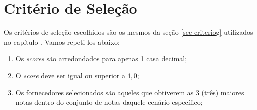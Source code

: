 \section{Critério de Seleção}
\label{sec-criteriof}

Os critérios de seleção escolhidos são os mesmos da seção \ref{sec-criteriog} utilizados no capítulo . Vamos repeti-los abaixo:

\begin{enumerate}
    \item Os \emph{scores} são arredondados para apenas 1 casa decimal;  
    \item O \emph{score} deve ser igual ou superior a $4,0$;
    \item Os fornecedores selecionados são aqueles que obtiverem as 3 (três) maiores notas dentro do conjunto de notas daquele cenário específico; 
\end{enumerate}



















